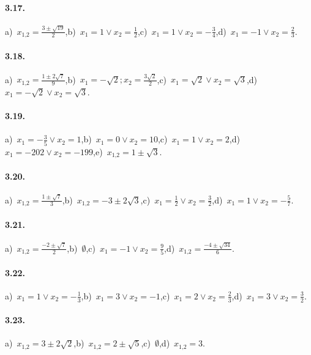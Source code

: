 \paragraph{3.17.} a)~$x_{1\text{,}2} = \frac{3 \pm \sqrt{19}}{2}$,\quad b)~$x_{1} = 1 \vee x_{2} = \frac{1}{2}$,\quad c)~$x_{1} = 1 \vee x_{2} =-\frac{3}{4}$,\quad d)~$x_{1} =-1 \vee x_{2} = \frac{2}{3}$.

\paragraph{3.18.} a)~$x_{1\text{,}2} = \frac{1 \pm 2 \sqrt{7}}{9}$,\quad b)~$x_{1} =-\sqrt{2};x_{2} = \frac{3 \sqrt{2}}{2}$,\quad c)~$x_{1} = \sqrt{2} \vee x_{2} = \sqrt{3}$,\quad d)~$x_{1} =-\sqrt{2} \vee x_{2} = \sqrt{3}$.

\paragraph{3.19.} a)~$x_{1} =-\frac{3}{5} \vee x_{2} = 1$,\quad b)~$x_{1} = 0 \vee x_{2} = 10$,\quad c)~$x_{1} = 1 \vee x_{2} = 2$,\quad d)~$x_{1} =-202 \vee x_{2} =-199$,\quad e)~$x_{1\text{,}2} = 1 \pm \sqrt{3}$.

\paragraph{3.20.} a)~$x_{1\text{,}2} = \frac{1 \pm \sqrt{7}}{3}$,\quad b)~$x_{1\text{,}2} =-3 \pm 2 \sqrt{3}$,\quad c)~$x_{1} = \frac{1}{2} \vee x_{2} = \frac{3}{2}$,\quad d)~$x_{1} = 1 \vee x_{2} =-\frac{5}{7}$.

\paragraph{3.21.} a)~$x_{1\text{,}2} = \frac{- 2 \pm \sqrt{7}}{2}$,\quad b)~$\emptyset$,\quad c)~$x_{1} =-1 \vee x_{2} = \frac{9}{5}$,\quad d)~$x_{1\text{,}2} = \frac{- 4 \pm \sqrt{34}}{6}$.

\paragraph{3.22.} a)~$x_{1} = 1 \vee x_{2} =-\frac{1}{3}$,\quad b)~$x_{1} = 3 \vee x_{2} =-1$,\quad c)~$x_{1} = 2 \vee x_{2} = \frac{2}{3}$,\quad d)~$x_{1} = 3 \vee x_{2} = \frac{3}{2}$.

\paragraph{3.23.} a)~$x_{1\text{,}2} = 3 \pm 2 \sqrt{2}$,\quad b)~$x_{1\text{,}2} = 2 \pm \sqrt{5}$,\quad c)~$\emptyset$,\quad d)~$x_{1\text{,}2} =3$.

